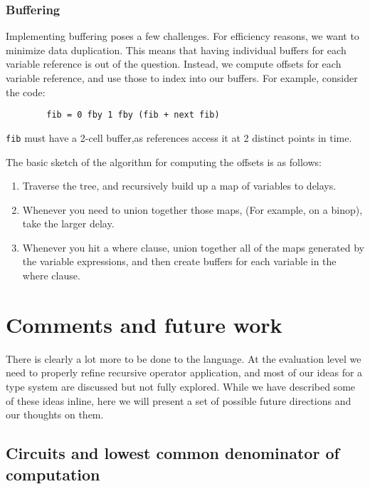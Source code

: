 \documentclass{scrartcl}
\begin{document}
    \subsubsection{Buffering}
    Implementing buffering poses a few challenges. For efficiency reasons, we want to minimize data duplication.
    This means that having individual buffers for each variable reference is out of the question. Instead, we compute
    offsets for each variable reference, and use those to index into our buffers. For example, consider the code:
    \begin{lstlisting}
        fib = 0 fby 1 fby (fib + next fib)
    \end{lstlisting}
    \lstinline{fib} must have a 2-cell buffer,as references access it at 2 distinct points in time.

    The basic sketch of the algorithm for computing the offsets is as follows:
    \begin{enumerate}
        \item Traverse the tree, and recursively build up a map of variables to delays.
        \item Whenever you need to union together those maps, (For example, on a binop), take the 
            larger delay.
        \item Whenever you hit a where clause, union together all of the maps generated by the variable
            expressions, and then create buffers for each variable in the where clause.
    \end{enumerate}





    \section{Comments and future work}
    
    There is clearly a lot more to be done to the language. At the evaluation level we need to properly refine recursive operator application, and most of our ideas for a type system are discussed but not fully explored. While we have described some of these ideas inline, here we will present a set of possible future directions and our thoughts on them.
    
    \subsection{Circuits and lowest common denominator of computation}
    
\end{document}
